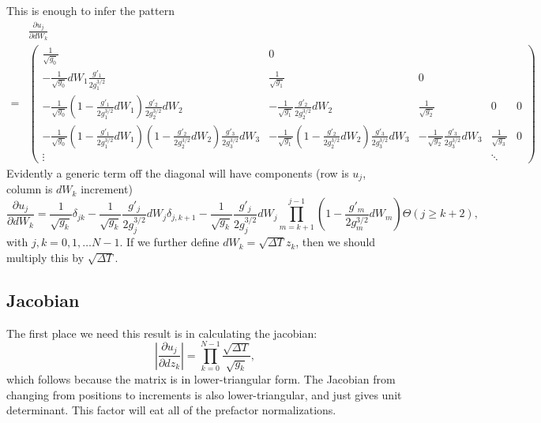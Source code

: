 This is enough to infer the pattern
\begin{align}
&\frac{\partial u_j}{\partial dW_k} \nonumber\\
=& \left( 
\begin{array}{lllllll}
\frac{1}{\sqrt{g_0}}      & 0     &   \\
-\frac{1}{\sqrt{g_0}}dW_1\frac{g'_{1}}{2g^{3/2}_1}    & \frac{1}{\sqrt{g_1}}     & 0 \\
-\frac{1}{\sqrt{g_0}}\left(1-\frac{g'_{1}}{2g^{3/2}_1}dW_1\right)\frac{g'_{2}}{2g^{3/2}_2}dW_2 & -\frac{1}{\sqrt{g_1}}\frac{g'_{2}}{2g^{3/2}_2}dW_2    & \frac{1}{\sqrt{g_2}}   & 0 & 0 \\
-\frac{1}{\sqrt{g_0}}\left(1-\frac{g'_{1}}{2g^{3/2}_1}dW_1\right)\left(1-\frac{g'_{2}}{2g^{3/2}_2}dW_2\right)\frac{g'_{3}}{2g^{3/2}_3}dW_3 &  -\frac{1}{\sqrt{g_1}}(1-\frac{g'_{2}}{2g^{3/2}_2}dW_2)\frac{g'_{3}}{2g^{3/2}_3}dW_3     &  -\frac{1}{\sqrt{g_2}}\frac{g'_{3}}{2g^{3/2}_3}dW_3 &\frac{1}{\sqrt{g_3}} & 0 \\
\vdots & & & \ddots
\end{array}
\right)
\end{align}
Evidently a generic term off the diagonal will have components (row is $u_j$, column is $dW_k$ increment)
\begin{equation}
\boxed{\frac{\partial u_j}{\partial dW_k} =
 \frac{1}{\sqrt{g_k}}\delta_{jk} - \frac{1}{\sqrt{g_k}}\frac{g'_j}{2g^{3/2}_j}dW_j\delta_{j,k+1}
 - \frac{1}{\sqrt{g_k}}\frac{g'_j}{2g^{3/2}_j}dW_j\prod_{m=k+1}^{j-1} \left(1- \frac{g'_m}{2g^{3/2}_m}dW_m\right)\Theta(j\ge k+2),}
\end{equation}
with $j,k=0,1,\ldots N-1$. If we further define $dW_k = \sqrt{\Delta T}z_k$, then we should multiply this by $\sqrt{\Delta T}$.  

\subsection{Jacobian}

The first place we need this result is in calculating the jacobian:
\begin{equation}
\left|\frac{\partial u_j}{\partial dz_k}\right| = \prod_{k=0}^{N-1}\frac{\sqrt{\Delta T}}{\sqrt{g_k}},
\end{equation}
which follows because the matrix is in lower-triangular form.
  The Jacobian from changing from positions to increments is also lower-triangular, and just gives unit determinant.
  This factor will eat all of the prefactor normalizations.  

